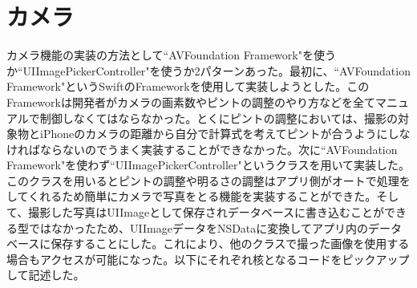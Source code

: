 \section{カメラ}
カメラ機能の実装の方法として``AVFoundation Framework"を使うか``UIImagePickerController"を使うか2パターンあった。最初に、``AVFoundation Framework"というSwiftのFrameworkを使用して実装しようとした。このFrameworkは開発者がカメラの画素数やピントの調整のやり方などを全てマニュアルで制御しなくてはならなかった。とくにピントの調整においては、撮影の対象物とiPhoneのカメラの距離から自分で計算式を考えてピントが合うようにしなければならないのでうまく実装することができなかった。次に``AVFoundation Framework"を使わず``UIImagePickerController"というクラスを用いて実装した。このクラスを用いるとピントの調整や明るさの調整はアプリ側がオートで処理をしてくれるため簡単にカメラで写真をとる機能を実装することができた。そして、撮影した写真はUIImageとして保存されデータベースに書き込むことができる型ではなかったため、UIImageデータをNSDataに変換してアプリ内のデータベースに保存することにした。これにより、他のクラスで撮った画像を使用する場合もアクセスが可能になった。以下にそれぞれ核となるコードをピックアップして記述した。

